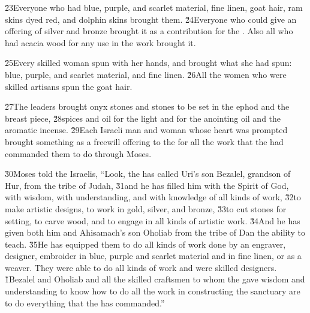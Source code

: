 \v{23}Everyone who had blue, purple, and scarlet material, fine linen, goat hair, ram skins dyed red, and dolphin skins brought them. \v{24}Everyone who could give an offering of silver and bronze brought it as a contribution for the . Also all who had acacia wood for any use in the work brought it.

\v{25}Every skilled woman spun with her hands, and brought what she had spun: blue, purple, and scarlet material, and fine linen. \v{26}All the women who were skilled artisans spun the goat hair.

\v{27}The leaders brought onyx stones and stones to be set in the ephod and the breast piece, \v{28}spices and oil for the light and for the anointing oil and the aromatic incense. \v{29}Each Israeli man and woman whose heart was prompted brought something as a freewill offering to the  for all the work that the  had commanded them to do through Moses.

\v{30}Moses told the Israelis, ``Look, the  has called Uri's son Bezalel, grandson of Hur, from the tribe of Judah, \v{31}and he has filled him with the Spirit of God, with wisdom, with understanding, and with knowledge of all kinds of work, \v{32}to make artistic designs, to work in gold, silver, and bronze, \v{33}to cut stones for setting, to carve wood, and to engage in all kinds of artistic work. \v{34}And he has given both him and Ahisamach's son Oholiab from the tribe of Dan the ability to teach. \v{35}He has equipped them to do all kinds of work done by an engraver, designer, embroider in blue, purple and scarlet material and in fine linen, or as a weaver. They were able to do all kinds of work and were skilled designers.
\v{1}Bezalel and Oholiab and all the skilled craftsmen to whom the  gave wisdom and understanding to know how to do all the work in constructing the sanctuary are to do everything that the  has commanded.''


